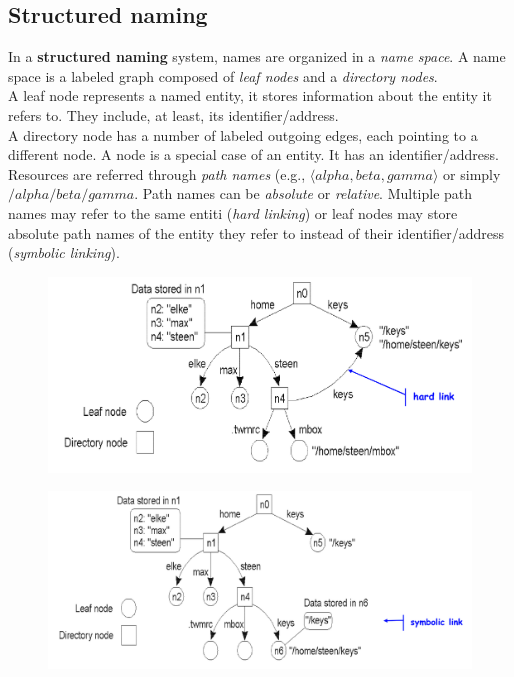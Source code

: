 \documentclass[10pt,a4paper]{article}
\begin{document}
\subsection{Structured naming}
In a \textbf{structured naming} system, names are organized in a \textit{name space}. A name space is a labeled graph composed of \textit{leaf nodes} and a \textit{directory nodes}. \\ A leaf node represents a named entity, it stores information about the entity it refers to. They include, at least, its identifier/address.\\ A directory node has a number of labeled outgoing edges, each pointing to a different node. A node is a special case of an entity. It has an identifier/address. \\
Resources are referred through \textit{path names} (e.g., $\langle alpha,beta,gamma\rangle$ or simply $/alpha/beta/gamma$. Path names can be \textit{absolute} or \textit{relative}. Multiple path names may refer to the same entiti (\textit{hard linking}) or leaf nodes may store absolute path names of the entity they refer to instead of their identifier/address (\textit{symbolic linking}).
\begin{figure}[h!]
\centering
\begin{minipage}{.5\textwidth}
  \centering
  \includegraphics[width=.8\linewidth]{images/structured-hard.png}
  \label{fig:struct-hard}
\end{minipage}%
\begin{minipage}{.5\textwidth}
  \centering
  \includegraphics[width=.8\linewidth]{images/structured-symbolic.png}
  \label{fig:struct-sym}
\end{minipage}
\end{figure} 
\end{document}
